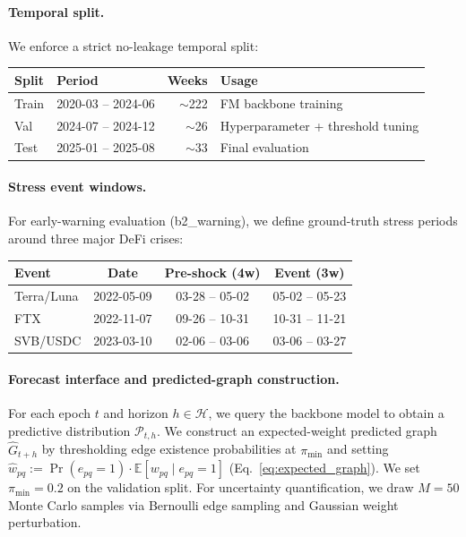 \paragraph{Temporal split.}
We enforce a strict no-leakage temporal split:
\begin{center}
\footnotesize
\setlength{\tabcolsep}{3pt}
\begin{tabularx}{\linewidth}{@{}llrX@{}}
\toprule
Split & Period & Weeks & Usage \\
\midrule
Train & 2020-03 -- 2024-06 & $\sim$222 & FM backbone training \\
Val   & 2024-07 -- 2024-12 & $\sim$26  & Hyperparameter + threshold tuning \\
Test  & 2025-01 -- 2025-08 & $\sim$33  & Final evaluation \\
\bottomrule
\end{tabularx}
\end{center}

\paragraph{Stress event windows.}
For early-warning evaluation (b2_warning), we define ground-truth stress periods around three major DeFi crises:
\begin{center}
\footnotesize
\setlength{\tabcolsep}{3pt}
\begin{tabularx}{\linewidth}{@{}lccc@{}}
\toprule
Event & Date & Pre-shock (4w) & Event (3w) \\
\midrule
Terra/Luna & 2022-05-09 & 03-28 -- 05-02 & 05-02 -- 05-23 \\
FTX        & 2022-11-07 & 09-26 -- 10-31 & 10-31 -- 11-21 \\
SVB/USDC   & 2023-03-10 & 02-06 -- 03-06 & 03-06 -- 03-27 \\
\bottomrule
\end{tabularx}
\end{center}

\paragraph{Forecast interface and predicted-graph construction.}
For each epoch $t$ and horizon $h\in\mathcal{H}$, we query the backbone model to obtain a predictive distribution $\mathcal{P}_{t,h}$. We construct an expected-weight predicted graph $\widehat{G}_{t+h}$ by thresholding edge existence probabilities at $\pi_{\min}$ and setting $\widehat{w}_{pq} := \Pr(e_{pq}=1)\cdot \mathbb{E}[w_{pq}\mid e_{pq}=1]$ (Eq.~\eqref{eq:expected_graph}). We set $\pi_{\min}=0.2$ on the validation split. For uncertainty quantification, we draw $M=50$ Monte Carlo samples via Bernoulli edge sampling and Gaussian weight perturbation.

